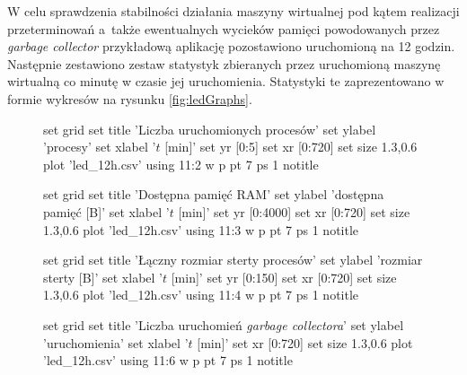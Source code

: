 W celu sprawdzenia stabilności działania maszyny wirtualnej pod kątem realizacji przeterminowań a~także ewentualnych wycieków pamięci powodowanych przez \emph{garbage collector} przykładową aplikację pozostawiono uruchomioną na 12 godzin.
Następnie zestawiono zestaw statystyk zbieranych przez uruchomioną maszynę wirtualną co minutę w czasie jej uruchomienia.
Statystyki te zaprezentowano w formie wykresów na rysunku \ref{fig:ledGraphs}.

\begin{figure}
\begin{gnuplot}[terminal=epslatex,terminaloptions=color]
	set grid
	set title 'Liczba uruchomionych procesów'
	set ylabel 'procesy'
	set xlabel '$t$ [min]'
	set yr [0:5]
	set xr [0:720]
	set size 1.3,0.6
	plot 'led_12h.csv' using 11:2 w p pt 7 ps 1 notitle
\end{gnuplot}

\begin{gnuplot}[terminal=epslatex,terminaloptions=color]
	set grid
	set title 'Dostępna pamięć RAM'
	set ylabel 'dostępna pamięć [B]'
	set xlabel '$t$ [min]'
	set yr [0:4000]
	set xr [0:720]
	set size 1.3,0.6
	plot 'led_12h.csv' using 11:3 w p pt 7 ps 1 notitle
\end{gnuplot}

\begin{gnuplot}[terminal=epslatex,terminaloptions=color]
	set grid
	set title 'Łączny rozmiar sterty procesów'
	set ylabel 'rozmiar sterty [B]'
	set xlabel '$t$ [min]'
	set yr [0:150]
	set xr [0:720]
	set size 1.3,0.6
	plot 'led_12h.csv' using 11:4 w p pt 7 ps 1 notitle
\end{gnuplot}

\begin{gnuplot}[terminal=epslatex,terminaloptions=color]
	set grid
	set title 'Liczba uruchomień \emph{garbage collectora}'
	set ylabel 'uruchomienia'
	set xlabel '$t$ [min]'
	set xr [0:720]
	set size 1.3,0.6
	plot 'led_12h.csv' using 11:6 w p pt 7 ps 1 notitle
\end{gnuplot}
\end{figure}

